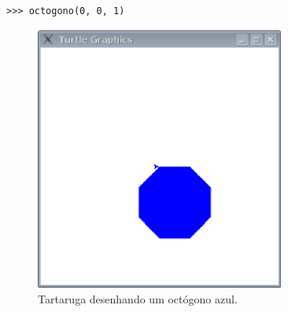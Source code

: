 \begin{listing}
\begin{verbatim}
>>> octogono(0, 0, 1)
\end{verbatim}
\end{listing}

\begin{figure}
\begin{center}
\includegraphics[width=82mm]{eps/figure49.eps}
\end{center}
\caption{Tartaruga desenhando um octógono azul.}\label{fig49}
\end{figure}
\newpage
